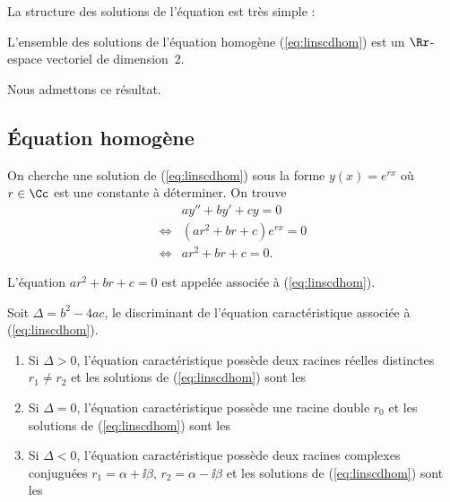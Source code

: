 \documentclass[class=report,crop=false]{standalone}
\begin{document}
La structure des solutions de l'équation est très simple :
\begin{theoreme}
\label{th:eqdiffdim}
L'ensemble des solutions de l'équation homogène (\ref{eq:linscdhom}) est
un $\Rr$-espace vectoriel de dimension~$2$.
\end{theoreme}

Nous admettons ce résultat.


\subsection{Équation homogène}

On cherche une solution de (\ref{eq:linscdhom}) sous la forme
$y(x)=e^{rx}$ où $r \in \Cc$ est une constante à déterminer. On trouve
\begin{eqnarray*}
     & ay''+by'+cy=0 \\
\iff & (ar^2+br+c)e^{rx}=0 \\
\iff & ar^2+br+c=0.
\end{eqnarray*}

\begin{definition}
L'équation $ar^2+br+c=0$ est appelée
 associée à (\ref{eq:linscdhom}).
\end{definition}

Soit $\Delta= b^2-4ac$, le discriminant de l'équation
caractéristique associée à (\ref{eq:linscdhom}).


\begin{theoreme}
\sauteligne
\begin{enumerate}

\item Si $\Delta >0$, l'équation caractéristique possède deux racines réelles distinctes
$r_1\neq r_2$ et les solutions de (\ref{eq:linscdhom}) sont les

\item Si $\Delta=0$, l'équation caractéristique possède une racine double $r_0$
et les solutions de (\ref{eq:linscdhom}) sont les

\item Si $\Delta<0$, l'équation caractéristique possède deux racines complexes
conjuguées $r_1=\alpha+\ii \beta$, $r_2=\alpha-\ii \beta$ et les solutions de (\ref{eq:linscdhom}) sont les

\end{enumerate}
\end{theoreme}
\end{document}
